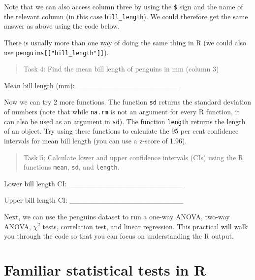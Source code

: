 \documentclass[
]{scrbook}
\newenvironment{Shaded}{\begin{snugshade}}{\end{snugshade}}
\newcommand{\AttributeTok}[1]{\textcolor[rgb]{0.77,0.63,0.00}{#1}}
\newcommand{\ConstantTok}[1]{\textcolor[rgb]{0.00,0.00,0.00}{#1}}
\newcommand{\FunctionTok}[1]{\textcolor[rgb]{0.00,0.00,0.00}{#1}}
\newcommand{\NormalTok}[1]{#1}
\newcommand{\SpecialCharTok}[1]{\textcolor[rgb]{0.00,0.00,0.00}{#1}}
\begin{document}
Note that we can also access column three by using the \texttt{\$} sign and the name of the relevant column (in this case \texttt{bill\_length}).
We could therefore get the same answer as above using the code below.

\begin{Shaded}
\end{Shaded}

There is usually more than one way of doing the same thing in R (we could also use \texttt{penguins{[}{[}"bill\_length"{]}{]}}).

\begin{quote}
Task 4: Find the mean bill length of penguins in mm (column 3)
\end{quote}

Mean bill length (mm): \_\_\_\_\_\_\_\_\_\_\_\_\_\_\_\_\_\_\_\_

Now we can try 2 more functions.
The function \texttt{sd} returns the standard deviation of numbers (note that while \texttt{na.rm} is not an argument for every R function, it can also be used as an argument in \texttt{sd}).
The function \texttt{length} returns the length of an object.
Try using these functions to calculate the 95 per cent confidence intervals for mean bill length (you can use a z-score of 1.96).

\begin{quote}
Task 5: Calculate lower and upper confidence intervals (CIs) using the R functions \texttt{mean}, \texttt{sd}, and \texttt{length}.
\end{quote}

Lower bill length CI: \_\_\_\_\_\_\_\_\_\_\_\_\_\_\_\_\_\_\_\_\_\_

Upper bill length CI: \_\_\_\_\_\_\_\_\_\_\_\_\_\_\_\_\_\_\_\_\_\_

Next, we can use the penguins dataset to run a one-way ANOVA, two-way ANOVA, \(\chi^{2}\) tests, correlation test, and linear regression.
This practical will walk you through the code so that you can focus on understanding the R output.

\hypertarget{familiar-statistical-tests-in-r}{%
\section{Familiar statistical tests in R}\label{familiar-statistical-tests-in-r}}
\end{document}

